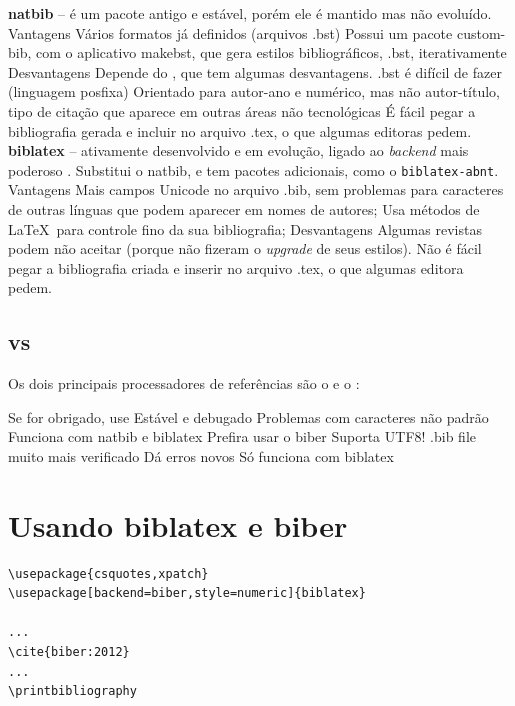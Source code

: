 \begin{outline}
    \1 \textbf{natbib} -- é um pacote antigo e estável, porém ele é  mantido mas não evoluído. 
    \2 Vantagens
    \3 Vários formatos já definidos (arquivos .bst)
    \3 Possui um pacote custom-bib, com o aplicativo makebst, que gera estilos bibliográficos, .bst, iterativamente
    \2 Desvantagens
    \3 Depende do , que tem algumas desvantagens.
    \3 .bst é difícil de fazer (linguagem posfixa)
    \3 Orientado para autor-ano e numérico, mas não autor-título, tipo de citação que aparece em outras áreas não tecnológicas
    \3 É fácil pegar a bibliografia gerada e incluir no arquivo .tex, o que algumas editoras pedem.
    \1 \textbf{biblatex} -- ativamente desenvolvido e em evolução, ligado
    ao \textit{backend} mais poderoso . Substitui o natbib, e tem pacotes adicionais, como o \lstinline|biblatex-abnt|.
    \2 Vantagens
    \3 Mais campos
    \3 Unicode no arquivo .bib, sem problemas para caracteres de outras línguas que podem aparecer em nomes de autores;
    \3 Usa métodos de \LaTeX\ para controle fino da sua bibliografia;
    \2 Desvantagens
    \3 Algumas revistas podem não aceitar (porque não fizeram o
     \textit{upgrade} de seus estilos).
    \3 Não é fácil pegar a bibliografia criada e inserir no arquivo .tex, o que algumas editora pedem.
\end{outline}


\subsection{ vs }

Os dois principais processadores de referências são o  e o  :
\begin{outline}
    \1 
    \2 Se for obrigado, use 
    \2 Estável e debugado
    \2 Problemas com caracteres não padrão 
    \2 Funciona com natbib e biblatex
    \1 
    \2 Prefira usar o  biber
    \2 Suporta UTF8!
    \2 .bib file muito mais verificado
    \3 Dá erros novos
    \2 Só funciona com biblatex
\end{outline}



\section{Usando biblatex e biber}

\begin{lstlisting}[caption=Exemplo de uso de biblatex]
\usepackage{csquotes,xpatch}
\usepackage[backend=biber,style=numeric]{biblatex}

...
\cite{biber:2012}
...
\printbibliography
\end{lstlisting}


